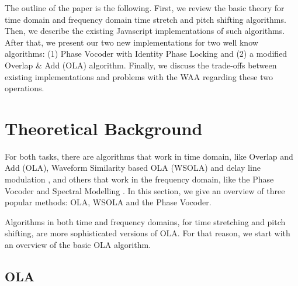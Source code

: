 \documentclass{sig-alternate}
\begin{document}
The outline of the paper is the following. First, we review the basic theory for time domain and frequency domain time stretch and pitch shifting algorithms. Then, we describe the existing Javascript implementations of such algorithms. After that, we present our two new implementations for two well know algorithms: (1) Phase Vocoder with Identity Phase Locking \cite{laroche:phasinessbusiness} and (2) a modified Overlap \& Add (OLA) algorithm. Finally, we discuss the trade-offs between existing implementations and problems with the WAA regarding these two operations.

\section{Theoretical Background}

For both tasks, there are algorithms that work in time domain, like Overlap and Add (OLA), Waveform Similarity based OLA (WSOLA) \cite{verhelst:wsola93} and delay line modulation \cite{modulationline:pitchshift}, and others that work in the frequency domain, like the Phase Vocoder \cite{dolsontutorial:phasevocoder} and Spectral Modelling \cite{dafx:2nd}. In this section, we give an overview of three popular methods: OLA, WSOLA and the Phase Vocoder.

Algorithms in both time and frequency domains, for time stretching and pitch shifting, are more sophisticated versions of OLA. For that reason, we start with an overview of the basic OLA algorithm.

\subsection{OLA}
\end{document}
